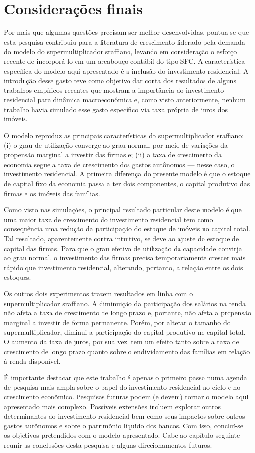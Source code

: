 \section{Considerações finais}\label{Conclusao_Modelo}

Por mais que algumas questões precisam ser melhor desenvolvidas, pontua-se que 
esta pesquisa contribuiu para a literatura de crescimento liderado pela demanda do modelo do supermultiplicador sraffiano, levando em consideração o esforço recente de incorporá-lo em um arcabouço contábil do tipo SFC.  A característica específica do modelo aqui apresentado é a inclusão do investimento residencial. A introdução desse gasto teve como objetivo dar conta dos resultados de alguns trabalhos empíricos recentes que mostram a importância do investimento residencial para dinâmica macroeconômica e, como visto anteriormente, nenhum trabalho havia simulado esse gasto específico via taxa própria de juros dos imóveis. 

O modelo reproduz as principais características do supermultiplicador sraffiano: (i) o grau de utilização converge ao grau normal, por meio de variações da propensão marginal a investir das firmas e; (ii) a taxa de crescimento da economia segue a taxa de crescimento dos gastos autônomos --- nesse caso, o investimento residencial. A primeira diferença do  presente modelo é que o estoque de capital fixo da economia passa a ter dois componentes, o capital produtivo das firmas e os imóveis das famílias. 

Como visto nas simulações, o principal resultado particular deste modelo é que uma maior taxa de crescimento do investimento residencial tem como consequência uma redução da participação do estoque de imóveis no capital total. Tal resultado, aparentemente contra intuitivo, se deve ao ajuste do estoque de capital das firmas. Para que o grau efetivo de utilização da capacidade convirja ao grau normal, o investimento das firmas precisa temporariamente crescer mais rápido que investimento residencial, alterando, portanto, a relação entre os dois estoques. 

Os outros dois experimentos trazem resultados em linha com o supermultiplicador sraffiano. A diminuição da participação dos salários na renda não afeta a taxa de crescimento de longo prazo e, portanto, não afeta a propensão marginal a investir de forma permanente. Porém, por alterar o tamanho do supermultiplicador, diminui a participação do capital produtivo no capital total. O aumento da taxa de juros, por sua vez, tem um efeito tanto sobre a taxa de crescimento de longo prazo quanto sobre o endividamento das famílias em relação à renda disponível. 

É importante destacar que este trabalho é apenas o primeiro passo numa agenda de pesquisa mais ampla sobre o papel do investimento residencial no ciclo e no crescimento econômico. Pesquisas futuras podem (e devem) tornar o modelo aqui apresentado mais complexo. Possíveis extensões incluem explorar outros determinantes do investimento residencial bem como seus impactos sobre outros gastos autônomos e sobre o patrimônio líquido dos bancos.
Com isso, concluí-se os objetivos pretendidos com o modelo apresentado. Cabe ao capítulo seguinte reunir as conclusões desta pesquisa e alguns direcionamentos futuros.
